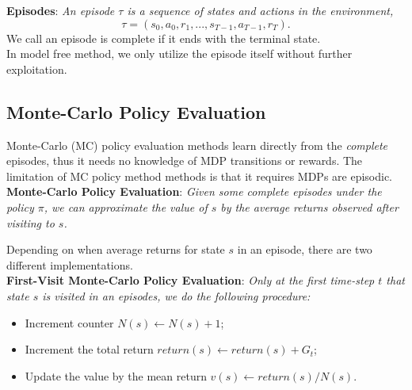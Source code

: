 \documentclass{progartcn}
\begin{document}
	\textbf{Episodes}: \textit{An episode $\tau$ is a sequence of states and actions in the environment,}
	\[\tau=(s_0,a_0,r_1,...,s_{T-1},a_{T-1},r_T).\]
	We call an episode is complete if it ends with the terminal state.\\

	In model free method, we only utilize the episode itself without further exploitation.\\

	\subsection{Monte-Carlo Policy Evaluation} 
		\label{subsec: Monte-Carlo Policy Evaluation}
		Monte-Carlo (MC) policy evaluation methods learn directly from the \textit{complete} episodes, thus it needs no knowledge of MDP transitions or rewards. The limitation of MC policy method methods is that it requires MDPs are episodic.\\

		\textbf{Monte-Carlo Policy Evaluation}: \textit{Given some complete episodes under the policy $\pi$, we can approximate the value of $s$ by the average returns observed after visiting to $s$.}

		Depending on when average returns for state $s$ in an episode, there are two different implementations.\\

		\textbf{First-Visit Monte-Carlo Policy Evaluation}: \textit{Only at the first time-step $t$ that state $s$ is visited in an episodes, we do the following procedure:}
		\begin{itemize}[noitemsep,topsep=0pt]
			\item Increment counter $N(s)\gets N(s)+1$;
			\item Increment the total return $return(s)\gets return(s)+G_t$;
			\item Update the value by the mean return $v(s)\gets return(s)/N(s)$.
		\end{itemize}
\end{document}
